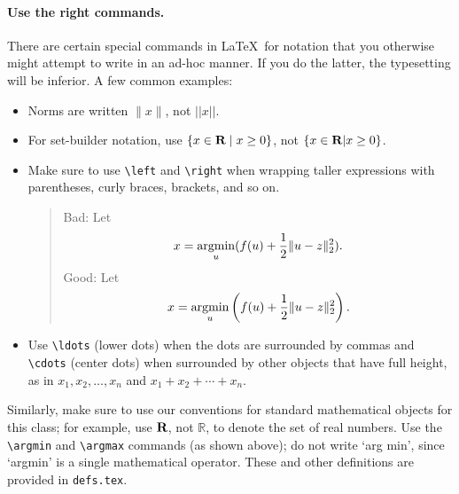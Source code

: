 \documentclass[12pt]{article}
\begin{document}
\paragraph{Use the right commands.}
There are certain special commands in \LaTeX\ for notation that you otherwise
might attempt to write in an ad-hoc manner. If you do the latter, the typesetting
will be inferior. A few common examples:
\begin{itemize}
\item Norms are written $\|x\|$, not $||x||$. 

\item For set-builder notation, use
$\{ x \in {\mbox{\bf R}} \mid x \geq 0 \}$, not $\{x \in {\mbox{\bf R}} | x \geq 0 \}$.

\item Make sure to use \verb+\left+ and \verb+\right+ when wrapping
taller expressions with parentheses, curly braces, brackets, and so on.
\begin{quote}
Bad: Let
\[
    x = \mathop{\rm argmin}_u (f(u) + \frac{1}{2}\|u - z\|_2^2).
\]
Good: Let
\[
    x = \mathop{\rm argmin}_u \left(f(u) + \frac{1}{2}\|u - z\|_2^2\right).
\]
\end{quote}

\item Use \verb+\ldots+ (lower dots) when the dots are surrounded by commas and
\verb+\cdots+ (center dots) when surrounded by other objects that have full
height, as in $x_1, x_2, \ldots, x_n$ and $x_1 + x_2 + \cdots + x_n$.
\end{itemize}
Similarly, make sure to use our conventions for standard mathematical objects
for this class; for example, use ${\mbox{\bf R}}$, not $\mathbb{R}$, to denote the set
of real numbers. Use the \verb+\argmin+ and \verb+\argmax+ commands (as shown
above); do not write `arg min', since `argmin' is a single mathematical
operator.  These and other definitions are provided in \verb+defs.tex+.



\label{s-content}
\end{document}
